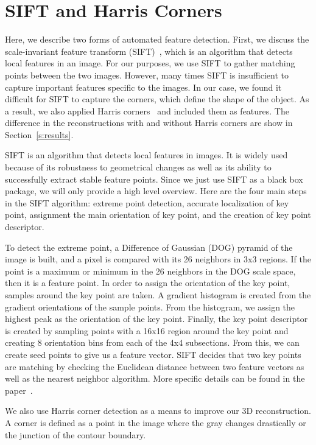 \section{SIFT and Harris Corners}
\label{s:sift}

Here, we describe two forms of automated feature detection. First, we discuss the scale-invariant feature transform (SIFT)~\cite{SIFT}, which is an algorithm that detects local features in an image. For our purposes, we use SIFT to gather matching points between the two images. However, many times SIFT is insufficient to capture important features specific to the images. In our case, we found it difficult for SIFT to capture the corners, which define the shape of the object. As a result, we also applied Harris corners~\cite{Corners} and included them as features. The difference in the reconstructions with and without Harris corners are show in Section~\ref{s:results}.

SIFT is an algorithm that detects local features in images. It is widely used because of its robustness to geometrical changes as well as its ability to successfully extract stable feature points. Since we just use SIFT as a black box package, we will only provide a high level overview. Here are the four main steps in the SIFT algorithm: extreme point detection, accurate localization of key point, assignment the main orientation of key point, and the creation of key point descriptor. 

To detect the extreme point, a Difference of Gaussian (DOG) pyramid of the image is built, and a pixel is compared with its 26 neighbors in 3x3 regions. If the point is a maximum or minimum in the 26 neighbors in the DOG scale space, then it is a feature point. In order to assign the orientation of the key point, samples around the key point are taken. A gradient histogram is created from the gradient orientations of the sample points. From the histogram, we assign the highest peak as the orientation of the key point. Finally, the key point descriptor is created by sampling points with a 16x16 region around the key point and creating 8 orientation bins from each of the 4x4 subsections. From this, we can create seed points to give us a feature vector. SIFT decides that two key points are matching by checking the Euclidean distance between two feature vectors as well as the nearest neighbor algorithm. More specific details can be found in the paper~\cite{SIFT}.

We also use Harris corner detection as a means to improve our 3D reconstruction. A corner is defined as a point in the image where the gray changes drastically or the junction of the contour boundary. 

